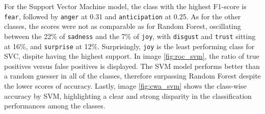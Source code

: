 

For the Support Vector Machine model, the class with the highest F1-score is \texttt{fear}, followed by \texttt{anger} at 0.31 and \texttt{anticipation} at 0.25. 
As for the other classes, the scores were not as comparable as for Random Forest, oscillating between the 22\% of \texttt{sadness} and the 7\% of \texttt{joy}, with \texttt{disgust} and \texttt{trust} sitting at 16\%, and \texttt{surprise} at 12\%. 
Surprisingly, \texttt{joy} is the least performing class for SVC, dispite having the highest support.   
In image \ref{fig:roc_svm}, the ratio of true positives versus false positives is displayed. 
The SVM model performs better than a random guesser in all of the classes, therefore surpassing Random Forest despite the lower scores of accuracy. 
Lastly, image \ref{fig:cwa_svm} shows the class-wise accuracy by SVM, highlighting a clear and strong disparity in the classification performances among the classes.
